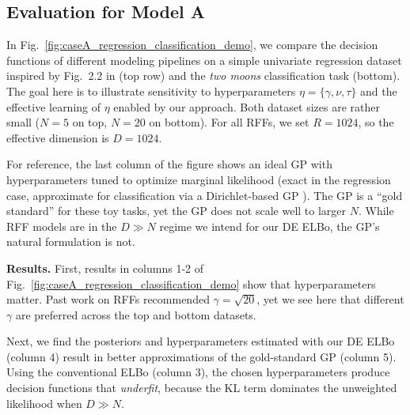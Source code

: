 \subsection{Evaluation for Model A}

In Fig.~\ref{fig:caseA_regression_classification_demo}, we compare the decision functions of different modeling pipelines on a simple univariate regression dataset inspired by Fig.~2.2 in \citet{rasmussen2006gaussian} (top row) and the \emph{two moons} classification task (bottom).
The goal here is to illustrate sensitivity to hyperparameters $\eta = \{\gamma,\nu,\tau\}$ and the effective learning of $\eta$ enabled by our approach. 
Both dataset sizes are rather small ($N=5$ on top, $N=20$ on bottom).
For all RFFs, we set $R=1024$, so the effective dimension is $D=1024$. %

For reference, the last column of the figure shows an ideal GP with hyperparameters tuned to optimize marginal likelihood (exact in the regression case, approximate for classification via a Dirichlet-based GP \citep{milios2018dirichlet}).
The GP is a ``gold standard'' for these toy tasks, yet the GP does not scale well to larger $N$.
While RFF models are in the $D \gg N$ regime we intend for our DE ELBo, the GP's natural formulation is not.

\textbf{Results.}
First, results in columns 1-2 of Fig.~\ref{fig:caseA_regression_classification_demo} show that hyperparameters matter. Past work on RFFs \cite{liu2020simple} recommended $\gamma = \sqrt{20}$, yet we see here that different $\gamma$ are preferred across the top and bottom datasets.

Next, we find the posteriors and hyperparameters estimated with our DE ELBo (column 4) result in better approximations of the gold-standard GP (column 5). Using the conventional ELBo (column 3), the chosen hyperparameters produce decision functions that \emph{underfit}, because the KL term dominates the unweighted likelihood when $D \gg N$.

